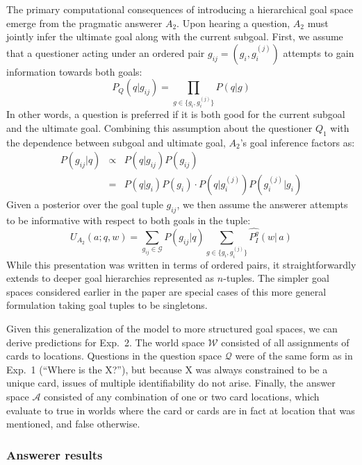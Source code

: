 \documentclass[11pt, floatsintext]{apa6}
\begin{document}
The primary computational consequences of introducing a hierarchical goal space emerge from the pragmatic answerer $A_2$. 
Upon hearing a question, $A_2$ must jointly infer the ultimate goal along with the current subgoal.
First, we assume that a questioner acting under an ordered pair $g_{ij} = (g_i, g_i^{(j)})$ attempts to gain information towards both goals:
$$P_{Q}(q | g_{ij}) = \prod_{g\in \{g_i, g_i^{(j)}\}} P(q | g)$$
In other words, a question is preferred if it is both good for the current subgoal and the ultimate goal.
Combining this assumption about the questioner $Q_1$ with the dependence between subgoal and ultimate goal, $A_2$'s goal inference factors as:
$$\begin{array}{rcl}
P(g_{ij} | q) & \propto & P(q | g_{ij})P(g_{ij}) \\
 & = & P(q | g_i)P(g_i) \cdot P(q | g_i^{(j)}) P(g_i^{(j)} | g_i)
 \end{array}$$
Given a posterior over the goal tuple $g_{ij}$, we then assume the answerer attempts to be informative with respect to both goals in the tuple: 
$$U_{A_2}(a; q, w) = \sum_{g_{ij} \in \mathcal{G}} P(g_{ij}|q) \sum_{g\in \{g_i, g_i^{(j)}\}}\widehat{P^g_I}(w|\,a)$$
While this presentation was written in terms of ordered pairs, it straightforwardly extends to deeper goal hierarchies represented as $n$-tuples. 
The simpler goal spaces considered earlier in the paper are special cases of this more general formulation taking goal tuples to be singletons.

Given this generalization of the model to more structured goal spaces, we can derive predictions for Exp.~2. 
The world space $\mathcal{W}$ consisted of all assignments of cards to locations.
Questions in the question space $\mathcal{Q}$ were of the same form as in Exp.~1 (``Where is the X?''), but because X was always constrained to be a unique card, issues of multiple identifiability do not arise. 
Finally, the answer space $\mathcal{A}$ consisted of any combination of one or two card locations, which evaluate to true in worlds where the card or cards are in fact at location that was mentioned, and false otherwise.


\subsubsection{Answerer results}
\end{document}
